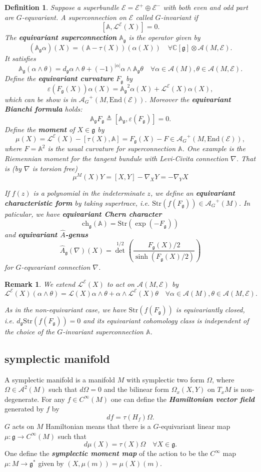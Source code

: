 \documentclass[12pt]{amsart}
\newtheorem{Def}[Thm]{Definition}
\newtheorem{Rmk}[Thm]{Remark}
\def\cA{{\mathcal{A}}}
\def\cAg{{\mathcal{A}_G}}
\def\cL{{\mathcal{L}}}
\def\cLE{\cL^\cE}
\def\cE{{\mathcal{E}}}
\def\bC{{\mathbb{C}}}
\def\bA{{\mathbb{A}}}
\def\bAg{{\mathbb{A}_\mathfrak{g}}}
\def\Fg{{F_{\fgg}}}
\def\fgg{{\mathfrak{g}}}
\def\dg{{d_{\fgg}}}
\def\End{{\mathrm{End}}}
\def\Str{{\mathrm{Str}}}
\def\kw#1{{\bf \em #1}}
\def\ch{\mathrm{ch}}
\def\Ah{{\hat{A}}}
\def\chg{\ch_\fgg}
\def\Ahg{\Ah_\fgg}
\begin{document}
\begin{Def}
Suppose a superbundle $\cE = \cE^+\oplus \cE^-$ 
with both even and odd part are $G$-equvariant.
A superconnection on $\cE$ called $G$-invariant if 
\[
[\bA,\cL^\cE(X)]=0.
\]
The \kw{equivariant superconnection} $\bAg$ is the operator given by 
\[
(\bAg \alpha)(X) = (\bA-\tau(X))(\alpha(X)) \quad \forall  \bC[\fgg]\otimes \cA(M,\cE).
\]
It satisfies \[
\bAg(\alpha\wedge \theta) = \dg \alpha \wedge \theta +
(-1)^{|\alpha|}\alpha\wedge \bAg\theta \quad \forall\alpha \in \cA(M),
\theta \in \cA(M,\cE).
\]
Define the \kw{equivariant curvature} $\Fg$ by
\[
\varepsilon(\Fg(X))\alpha(X) = \bAg^2\alpha(X) + \cL^\cE(X)\alpha(X),
\] 
which can be show is in $\cAg^+(M,\End(\cE))$.
Moreover the \kw{equivariant Bianchi formula} holds:
\[
\bAg\Fg \triangleq [\bAg,\varepsilon(\Fg)] = 0.
\]
Define the \kw{moment} of $X\in \fgg$ by 
\[
\mu(X) = \cLE(X) - [\tau(X),\bA] = \Fg(X) - F \in \cAg^+(M,\End(\cE)),
\]
where $F = \bA^2$ is the usual curvature for superconnection $\bA$.
One example is the Riemennian moment for the tangent bundule with Levi-Civita connection $\nabla$.
That is (by $\nabla$ is torsion free)
\begin{equation}\label{eq:Rm}
\mu^M(X)Y = [X,Y] - \nabla_X Y = -\nabla_Y X
\end{equation}

If $f(z)$ is a polynomial in the indeterminate $z$, we define an
\kw{equivariant characteristic form} by taking supertrace,
i.e. $\Str(f(\Fg)) \in \cAg^+(M)$. In paticular, we have
\kw{equivariant Chern character} 
\[\chg(\bA) = \Str(\exp(-\Fg))
\]
 and
\kw{equivariant $\Ah$-genus} 
\[
\Ahg(\nabla)(X) =
{\det}^{1/2}\left(\frac{\Fg(X)/2}{\sinh(\Fg(X)/2)}\right)
\]
for $G$-equvariant connection $\nabla$.
\end{Def}

\begin{Rmk}
We extend $\cL^\cE(X)$ to act on $\cA(M,\cE)$ by 
\[
\cLE(X)(\alpha\wedge \theta) =\cL(X) \alpha \wedge \theta +\alpha
\wedge \cLE(X)\theta \quad \forall \alpha\in \cA(M), \theta\in \cA(M,\cE).
\]

As in the non-equivariant case, we have $\Str(f(\Fg))$ is
equivariantly closed, i.e. $\dg \Str(f(\Fg)) = 0$ and its equivariant
cohomology class is independent of the choice of the $G$-invariant
superconnection $\bA$.
\end{Rmk}


\subsection{symplectic manifold}
A symplectic manifold is a manifold $M$ with symplectic two form
$\Omega$, where $\Omega\in \cA^2(M)$ such that $d\Omega=0$ and
the bilinear form $\Omega_x(X,Y)$ on $T_xM$ is non-degenerate.
For any $f\in C^\infty(M)$ one can define the \kw{Hamiltonian vector
  field} generated by $f$ by 
\[
df = \tau(H_f)\Omega.
\] 
$G$ acts on $M$ Hamiltonian means that there is a $G$-equivariant linear
map $\mu:\fgg\to C^\infty(M)$ such that 
\[
d\mu(X) = \tau(X) \Omega \quad \forall X\in \fgg.
\]
One define the \kw{symplectic moment map} of the action to be the
$C^\infty$ map $\mu\colon M\to \fgg^*$ given by $(X,\mu(m)) =
\mu(X)(m)$.
\end{document}
